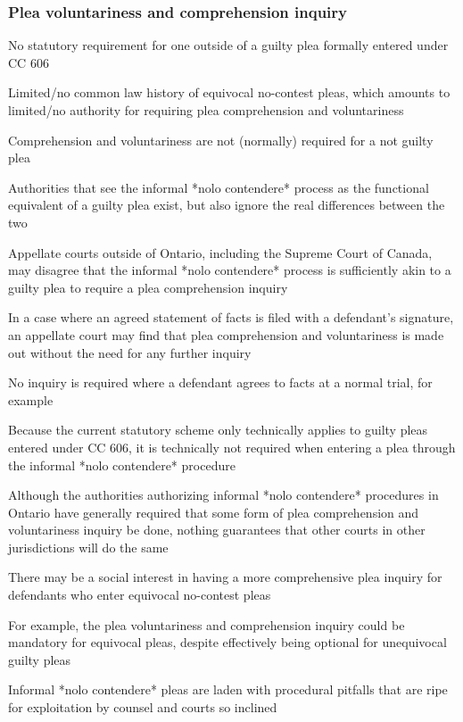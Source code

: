\subsubsection{Plea voluntariness and comprehension inquiry}

No statutory requirement for one outside of a guilty plea formally entered under CC 606

Limited/no common law history of equivocal no-contest pleas, which amounts to limited/no authority for requiring plea comprehension and voluntariness

Comprehension and voluntariness are not (normally) required for a not guilty plea

Authorities that see the informal *nolo contendere* process as the functional equivalent of a guilty plea exist, but also ignore the real differences between the two

Appellate courts outside of Ontario, including the Supreme Court of Canada, may disagree that the informal *nolo contendere* process is sufficiently akin to a guilty plea to require a plea comprehension inquiry

In a case where an agreed statement of facts is filed with a defendant's signature, an appellate court may find that plea comprehension and voluntariness is made out without the need for any further inquiry

No inquiry is required where a defendant agrees to facts at a normal trial, for example

Because the current statutory scheme only technically applies to guilty pleas entered under CC 606, it is technically not required when entering a plea through the informal *nolo contendere* procedure

Although the authorities authorizing informal *nolo contendere* procedures in Ontario have generally required that some form of plea comprehension and voluntariness inquiry be done, nothing guarantees that other courts in other jurisdictions will do the same

There may be a social interest in having a more comprehensive plea inquiry for defendants who enter equivocal no-contest pleas

For example, the plea voluntariness and comprehension inquiry could be mandatory for equivocal pleas, despite effectively being optional for unequivocal guilty pleas

Informal *nolo contendere* pleas are laden with procedural pitfalls that are ripe for exploitation by counsel and courts so inclined

